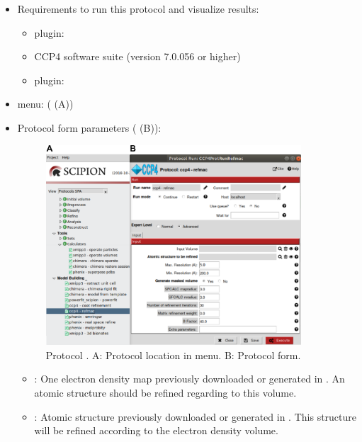 \begin{itemize}
  \item Requirements to run this protocol and visualize results:
    \begin{itemize}
        \item \scipion plugin: 
        \item CCP4 software suite (version 7.0.056 or higher)
        \item \scipion plugin: 
    \end{itemize}
  \item \scipion menu:
    ( (A))
  
  \item Protocol form parameters ( (B)):
  
    \begin{figure}[H]
     \centering 
     \captionsetup{width=.7\linewidth} 
     \includegraphics[width=0.90\textwidth]{Images_appendix/Fig126.pdf}
     \caption{Protocol . A: Protocol location in \scipion menu. B: Protocol form.}
     \label{fig:app_protocol_refmac_1}
    \end{figure}

    \begin{itemize}
     \item {}: One electron density map previously downloaded or generated in \scipion. An atomic structure should be refined regarding to this volume.
     
     \item {}: Atomic structure previously downloaded or generated in \scipion. This structure will be refined according to the electron density volume.
     

\end{itemize}
\end{itemize}
